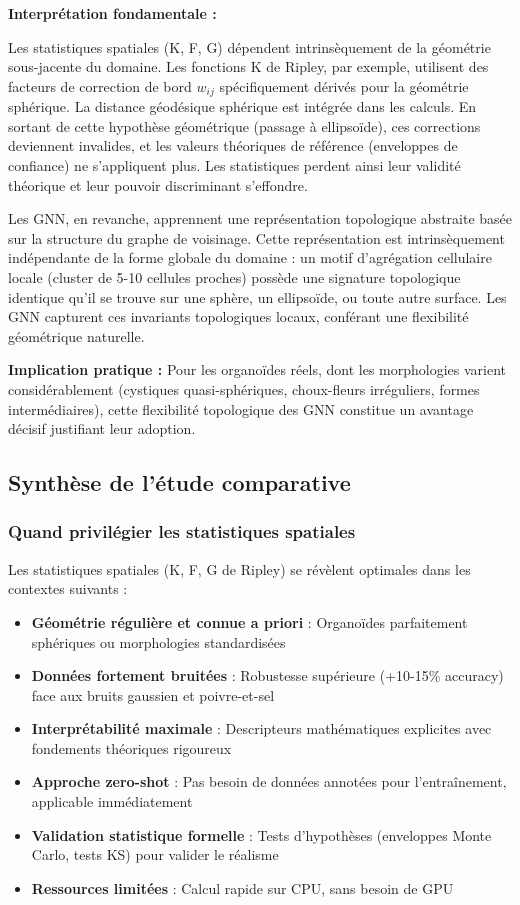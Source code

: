 \textbf{Interprétation fondamentale :}

Les statistiques spatiales (K, F, G) dépendent intrinsèquement de la géométrie sous-jacente du domaine. Les fonctions K de Ripley, par exemple, utilisent des facteurs de correction de bord $w_{ij}$ spécifiquement dérivés pour la géométrie sphérique. La distance géodésique sphérique est intégrée dans les calculs. En sortant de cette hypothèse géométrique (passage à ellipsoïde), ces corrections deviennent invalides, et les valeurs théoriques de référence (enveloppes de confiance) ne s'appliquent plus. Les statistiques perdent ainsi leur validité théorique et leur pouvoir discriminant s'effondre.

Les GNN, en revanche, apprennent une représentation topologique abstraite basée sur la structure du graphe de voisinage. Cette représentation est intrinsèquement indépendante de la forme globale du domaine : un motif d'agrégation cellulaire locale (cluster de 5-10 cellules proches) possède une signature topologique identique qu'il se trouve sur une sphère, un ellipsoïde, ou toute autre surface. Les GNN capturent ces invariants topologiques locaux, conférant une flexibilité géométrique naturelle.

\textbf{Implication pratique :} Pour les organoïdes réels, dont les morphologies varient considérablement (cystiques quasi-sphériques, choux-fleurs irréguliers, formes intermédiaires), cette flexibilité topologique des GNN constitue un avantage décisif justifiant leur adoption.

\subsection{Synthèse de l'étude comparative}

\subsubsection{Quand privilégier les statistiques spatiales}

Les statistiques spatiales (K, F, G de Ripley) se révèlent optimales dans les contextes suivants :

\begin{itemize}
    \item \textbf{Géométrie régulière et connue a priori} : Organoïdes parfaitement sphériques ou morphologies standardisées
    \item \textbf{Données fortement bruitées} : Robustesse supérieure (+10-15\% accuracy) face aux bruits gaussien et poivre-et-sel
    \item \textbf{Interprétabilité maximale} : Descripteurs mathématiques explicites avec fondements théoriques rigoureux
    \item \textbf{Approche zero-shot} : Pas besoin de données annotées pour l'entraînement, applicable immédiatement
    \item \textbf{Validation statistique formelle} : Tests d'hypothèses (enveloppes Monte Carlo, tests KS) pour valider le réalisme
    \item \textbf{Ressources limitées} : Calcul rapide sur CPU, sans besoin de GPU
\end{itemize}

